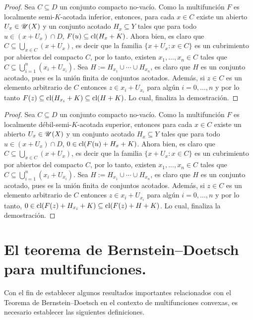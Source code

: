 \begin{proof}
Sea $C\subseteq D$ un conjunto compacto no-vacío.
Como la multifunción $F$ es localmente semi-$K$-acotada inferior, entonces, para cada
$x\in C$ existe un abierto $U_x\in \mathscr{U}(X)$ y un conjunto acotado $H_x\subseteq Y$ tales que
para todo $u\in (x+U_x)\cap D$, $F(u)\subseteq\mathop{\hbox{\rm cl}}\nolimits(H_x+K)$. Ahora bien, es claro que 
$C\subseteq \bigcup_{x\in C}(x+U_x)$, es decir que la familia $\{x+U_x:x\in C\}$ es un 
cubrimiento por abiertos del compacto $C$, por lo tanto, existen $x_1,\ldots,x_n\in C$
tales que $C\subseteq\bigcup_{i=1}^n(x_i+U_{x_i})$. Sea $H:=H_{x_1}\cup\cdots\cup H_{x_n}$,
es claro que $H$ es un conjunto acotado, pues es la unión finita de conjuntos acotados. Además,
si $z\in C$ es un elemento arbitrario de $C$ entonces $z\in x_i+U_{x_i}$ para algún $i=0,\ldots,n$
y por lo tanto $F(z)\subseteq\mathop{\hbox{\rm cl}}\nolimits(H_{x_i}+K)\subseteq\mathop{\hbox{\rm cl}}\nolimits(H+K)$. Lo cual, finaliza la demostración. 
\end{proof}

\begin{proof}
Sea $C\subseteq D$ un conjunto compacto no-vacío.
Como la multifunción $F$ es localmente débil-semi-$K$-acotada superior, entonces para cada
$x\in C$ existe un abierto $U_x\in \mathscr{U}(X)$ y un conjunto acotado $H_x\subseteq Y$ tales que
para todo $u\in (x+U_x)\cap D$, $0\in\mathop{\hbox{\rm cl}}\nolimits(F(u)+H_x+K)$. Ahora bien, es claro que 
$C\subseteq \bigcup_{x\in C}(x+U_x)$, es decir que la familia $\{x+U_x:x\in C\}$ es un 
cubrimiento por abiertos del compacto $C$, por lo tanto, existen $x_1,\ldots,x_n\in C$
tales que $C\subseteq\bigcup_{i=1}^n(x_i+U_{x_i})$. Sea $H:=H_{x_1}\cup\cdots\cup H_{x_n}$,
es claro que $H$ es un conjunto acotado, pues es la unión finita de conjuntos acotados. Además,
si $z\in C$ es un elemento arbitrario de $C$ entonces $z\in x_i+U_{x_i}$ para algún $i=0,\ldots,n$
y por lo tanto, $0\in\mathop{\hbox{\rm cl}}\nolimits(F(z)+H_{x_i}+K)\subseteq\mathop{\hbox{\rm cl}}\nolimits(F(z)+H+K)$. Lo cual, finaliza la demostración. 
\end{proof}

\section{El teorema de Bernstein--Doetsch para multifunciones.}

Con el fin de establecer algunos resultados importantes relacionados con
el Teorema de Bernstein--Doetsch en el contexto de multifunciones convexas,
es necesario establecer las siguientes definiciones.

